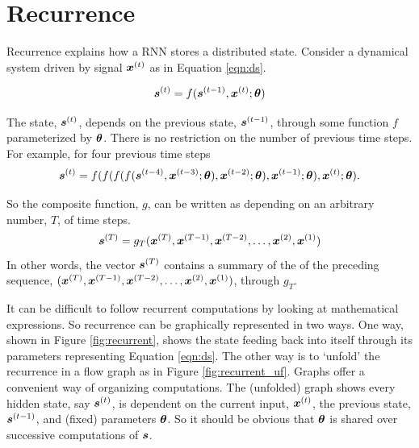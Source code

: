 
\section{Recurrence}

Recurrence explains how a RNN stores a distributed state. Consider a dynamical system driven by signal $\boldsymbol{x}^{(t)}$ as in Equation \ref{eqn:ds}.

\begin{equation}
  \boldsymbol{s}^{(t)} = f(\boldsymbol{s}^{(t-1)},\boldsymbol{x}^{(t)};\boldsymbol{\theta})
  \label{eqn:ds}
\end{equation}

The state, $\boldsymbol{s}\sp{(t)}$, depends on the previous state, $\boldsymbol{s}^{(t-1)}$, through some function $f$ parameterized by $\boldsymbol{\theta}$. There is no restriction on the number of previous time steps. For example, for four previous time steps
\begin{equation*}
\boldsymbol{s}\sp{(t)} = 
f(f(f(f(\boldsymbol{s}\sp{(t-4)}
,\boldsymbol{x}\sp{(t-3)};\boldsymbol{\theta})
,\boldsymbol{x}\sp{(t-2)};\boldsymbol{\theta})
,\boldsymbol{x}\sp{(t-1)};\boldsymbol{\theta})
,\boldsymbol{x}\sp{(t)};\boldsymbol{\theta})     .
\end{equation*}

So the composite function, $g$, can be written as depending on an arbitrary number, $T$, of time steps.
\begin{equation*}
\boldsymbol{s}\sp{(T)} = g_{T}(\boldsymbol{x}\sp{(T)},\boldsymbol{x}\sp{(T-1)},\boldsymbol{x}\sp{(T-2)},\ldots,\boldsymbol{x}\sp{(2)},\boldsymbol{x}\sp{(1)})
\end{equation*}
In other words, the vector $\boldsymbol{s}\sp{(T)}$ contains a summary of the of the preceding sequence, $(\boldsymbol{x}\sp{(T)},\boldsymbol{x}\sp{(T-1)},\boldsymbol{x}\sp{(T-2)},\ldots,\boldsymbol{x}\sp{(2)},\boldsymbol{x}\sp{(1)})$, through $g_T$.

It can be difficult to follow recurrent computations by looking at mathematical expressions. So recurrence can be graphically represented in two ways. One way, shown in Figure \ref{fig:recurrent}, shows the state feeding back into itself through its parameters representing Equation \ref{eqn:ds}. The other way is to `unfold' the recurrence in a flow graph as in Figure \ref{fig:recurrent_uf}. Graphs offer a convenient way of organizing computations. The (unfolded) graph shows every hidden state, say $\boldsymbol{s}\sp{(t)}$, is dependent on the current input, $\boldsymbol{x}\sp{(t)}$, the previous state, $\boldsymbol{s}\sp{(t-1)}$, and (fixed) parameters $\boldsymbol{\theta}$. So it should be obvious that $\boldsymbol{\theta}$ is shared over successive computations of $\boldsymbol{s}$.

